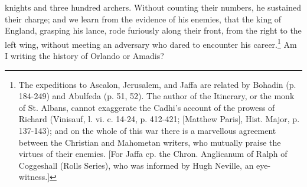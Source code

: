 knights and three hundred archers. Without counting their numbers, he sustained their charge; and we learn from the evidence of his enemies, that the king of England, grasping his lance, rode furiously along their front, from the right to the left wing, without meeting an adversary who dared to encounter his career.\footnote{The expeditions to Ascalon, Jerusalem, and Jaffa are related by Bohadin (p. 184-249) and Abulfeda (p. 51, 52). The author of the Itinerary, or the monk of St. Albans, cannot exaggerate the Cadhi\texthebrew{}’s account of the prowess of Richard (Vinisauf, l. vi. c. 14-24, p. 412-421; [Matthew Paris], Hist. Major, p. 137-143); and on the whole of this war there is a marvellous agreement between the Christian and Mahometan writers, who mutually praise the virtues of their enemies. [For Jaffa cp. the Chron. Anglicanum of Ralph of Coggeshall (Rolls Series), who was informed by Hugh Neville, an eye-witness.]} Am I writing the history of Orlando or Amadis?

